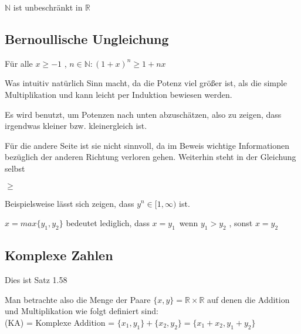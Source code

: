 \documentclass[headsepline,12pt,a4paper]{scrartcl}
\begin{document}
\begin{center}
\item[Lemma 1.52]
\end{center}
\item $ \mathbb{N} $ ist unbeschränkt in $\mathbb{R}$ 

\newpage

\subsection*{Bernoullische Ungleichung}

\item Für alle $ x \geq -1 $ , $ n\in \mathbb{N} : (1+x)^n \geq  1+nx $ 
\item Was intuitiv natürlich Sinn macht, da die Potenz viel größer ist, als die simple Multiplikation und kann leicht per Induktion bewiesen werden.
\item Es wird benutzt, um Potenzen nach unten abzuschätzen, also zu zeigen, dass irgendwas kleiner bzw. kleinergleich ist.
\item Für die andere Seite ist sie nicht sinnvoll, da im Beweis wichtige Informationen bezüglich der anderen Richtung verloren gehen. Weiterhin steht in der Gleichung selbst \begin{center}
$\geq $
\end{center} 
\item Beispielsweise lässt sich zeigen, dass $ y^{n} \in [1,\infty) $ ist.

\begin{center}
\item[Max und Min Funktion]
\end{center}
\item $x = max\{y_1,y_2\} $ bedeutet lediglich, dass $ x=y_1 \, $ wenn $ y_1 > y_2 $ , sonst $ x = y_2 $

\newpage

\subsection*{Komplexe Zahlen}

\item Dies ist Satz 1.58\\

\item Man betrachte also die Menge der Paare $\{x,y\}= \mathbb{R} \times \mathbb{R} $ auf denen die Addition und Multiplikation wie folgt definiert sind: \\
(KA) = Komplexe Addition = $\{x_1,y_1\} + \{x_2,y_2\} = \{x_1+x_2,y_1+y_2\} $ \\
\end{document}
